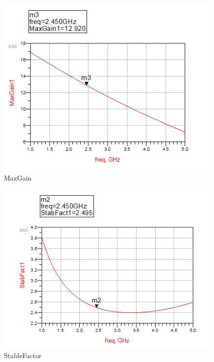 \documentclass[12pt,a4paper]{report}
\begin{document}
\begin{figure}
    \centerline{\includegraphics{MaxGain.PNG}}
    \caption{MaxGain}
    \label{fig:MaxGain}
\end{figure}

\begin{figure}
    \centerline{\includegraphics{StableFactor.PNG}}
    \caption{StableFactor}
    \label{fig:StableFactor}
\end{figure}
\end{document}
